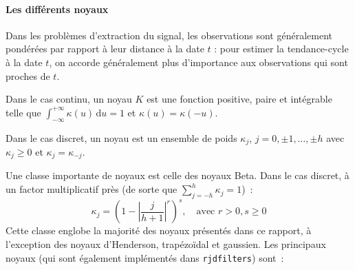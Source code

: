 \documentclass[
  11pt,
  french,
  a4paper]{article}
\newcommand\1{\mathds{1}}
\newcommand\ud{\,\mathrm{d}}
\begin{document}
\hypertarget{sec-kernels}{%
\paragraph{Les différents noyaux}\label{sec-kernels}}

Dans les problèmes d'extraction du signal, les observations sont généralement pondérées par rapport à leur distance à la date \(t\) : pour estimer la tendance-cycle à la date \(t\), on accorde généralement plus d'importance aux observations qui sont proches de \(t\).

Dans le cas continu, un noyau \(K\) est une fonction positive, paire et intégrable telle que \(\int_{-\infty}^{+\infty}\kappa(u) \ud u=1\) et \(\kappa(u)=\kappa(-u)\).

Dans le cas discret, un noyau est un ensemble de poids \(\kappa_j\), \(j=0,\pm1,\dots,\pm h\) avec \(\kappa_j \geq0\) et \(\kappa_j=\kappa_{-j}\).

Une classe importante de noyaux est celle des noyaux Beta.
Dans le cas discret, à un factor multiplicatif près (de sorte que \(\sum_{j=-h}^h\kappa_j=1\))~:
\[
\kappa_j = \left(
  1-
  \left\lvert
  \frac j {h+1}
  \right\lvert^r
\right)^s,\quad\text{avec }r>0,s\geq 0
\]
Cette classe englobe la majorité des noyaux présentés dans ce rapport, à l'exception des noyaux d'Henderson, trapézoïdal et gaussien.
Les principaux noyaux (qui sont également implémentés dans \texttt{rjdfilters}) sont~:
\end{document}
